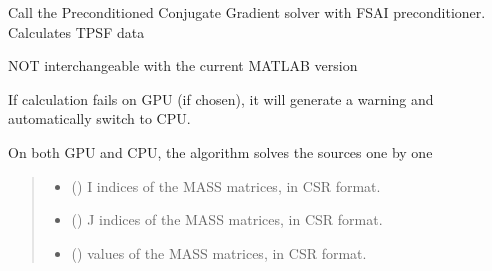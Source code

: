 \documentclass[letterpaper,10pt,english]{sphinxmanual}
\begin{document}
\begin{fulllineitems}
\label{\detokenize{_autosummary/nirfasterff.math.get_field_TR:nirfasterff.math.get_field_TR}}
\pysigstartsignatures
\pysiglinewithargsret
{}
{\sphinxparamcomma {}\sphinxparamcomma {}\sphinxparamcomma {}\sphinxparamcomma {}\sphinxparamcomma {}\sphinxparamcomma {}\sphinxparamcomma {}}
{}
\pysigstopsignatures
\sphinxAtStartPar
Call the Preconditioned Conjugate Gradient solver with FSAI preconditioner. Calculates TPSF data

\sphinxAtStartPar
NOT interchangeable with the current MATLAB version

\sphinxAtStartPar
If calculation fails on GPU (if chosen), it will generate a warning and automatically switch to CPU.

\sphinxAtStartPar
On both GPU and CPU, the algorithm solves the sources one by one
\begin{quote}\begin{description}
\begin{itemize}
\item {} 
\sphinxAtStartPar
{} (\sphinxstyleliteralemphasis{\sphinxupquote{, }}) \textendash{} I indices of the MASS matrices, in CSR format.

\item {} 
\sphinxAtStartPar
{} (\sphinxstyleliteralemphasis{\sphinxupquote{, }}) \textendash{} J indices of the MASS matrices, in CSR format.

\item {} 
\sphinxAtStartPar
{} () \textendash{} 
\sphinxAtStartPar
values of the MASS matrices, in CSR format.


\end{itemize}
\end{description}
\end{quote}
\end{fulllineitems}
\end{document}

